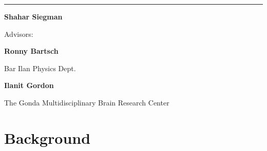 \documentclass[a4paper, 11pt]{report}      %
\begin{document}
\begin{titlepage}
{	\vspace{0.01\textheight} %
	\rule{0.3\textwidth}{0.4pt} %
	
	\vspace{10pt} %
	
	
	{\Large \bf Shahar Siegman}\par
	
	}%
	
	
	\vspace{0.05\textheight} %

	{\Large  Advisors: \par 
	\bf Ronny Bartsch \par}
	{\large Bar Ilan Physics Dept.\par} 
	{\Large \bf Ilanit Gordon \par} 
	{\large The Gonda Multidisciplinary Brain Research Center}  %
	
	
	

	
	
	
	
	
\end{titlepage}



{\renewcommand{\baselinestretch}{1.3}\selectfont
\tableofcontents
}

\pagebreak

\chapter{Background}
\end{document}
